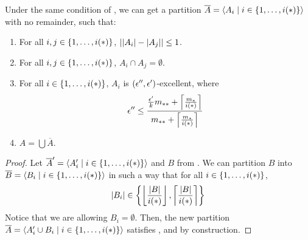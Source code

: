     \begin{lemma}[Claim 5.14.2] \label{lem:existance_of_excellent_partition_with_equal_size_and_no_remainder}
        Under the same condition of , we can get a
        partition $\overline{A} = \left< A_i \mid i \in \left\{ 1, \dots, i(*) \right\} \right>$ with no remainder, such that:
        \begin{enumerate}[label=(\alph*), ref=\alph*]
            \item \label{itm:existance_of_excellent_partition_with_equal_size_and_no_remainder.a} For all $i, j \in \left\{ 1, \dots, i(*) \right\}$, $\left| \left| A_i \right|- \left| A_j \right| \right| \leq 1$.
            \item \label{itm:existance_of_excellent_partition_with_equal_size_and_no_remainder.b} For all $i, j \in \left\{ 1, \dots, i(*) \right\}$, $A_i \cap A_j = \emptyset$.
            \item \label{itm:existance_of_excellent_partition_with_equal_size_and_no_remainder.c} For all $i \in \left\{ 1, \dots, i(*) \right\}$, $A_i$ is $\left( \epsilon'', \epsilon' \right)$-excellent,
                where
                \[
                    \epsilon'' \leq \frac{\frac{\epsilon'}{k} m_{**} + \left\lceil \frac{m_*}{i(*)} \right\rceil}{m_{**} + \left\lceil \frac{m_*}{i(*)} \right\rceil}
                \]
            \item \label{itm:existance_of_excellent_partition_with_equal_size_and_no_remainder.d} $A = \bigcup \overline{A}$.
        \end{enumerate}
        \begin{proof}
            Let $\overline{A}' = \left< A_i' \mid i \in \left\{ 1, \dots, i(*) \right\} \right>$ and $B$ from
            .
            We can partition $B$ into $\overline{B} = \left< B_i \mid i \in \left\{ 1, \dots, i(*) \right\} \right>$ in such a way that
            for all $i \in \left\{ 1, \dots, i(*) \right\}$,
            \[
                |B_i| \in \left\{ \left\lfloor \frac{\left| B \right|}{i(*)} \right\rfloor, \left\lceil \frac{\left| B \right|}{i(*)} \right\rceil \right\}
            \]
            Notice that we are allowing $B_i = \emptyset$.
            Then, the new partition $\overline{A} = \left< A_i' \cup B_i \mid i \in \left\{ 1, \dots, i(*) \right\} \right>$ satisfies
            ,
             and
             by construction.

\end{proof}
\end{lemma}
